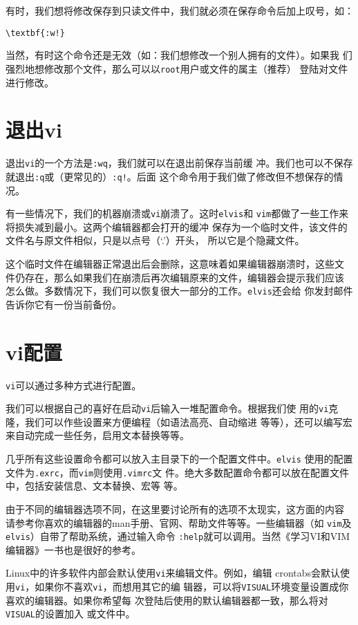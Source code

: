 有时，我们想将修改保存到只读文件中，我们就必须在保存命令后加上叹号，如：
\begin{Verbatim}[frame=single,commandchars=\\\{\}]
\textbf{:w!}
\end{Verbatim}

当然，有时这个命令还是无效（如：我们想修改一个别人拥有的文件）。如果我
们强烈地想修改那个文件，那么可以以\texttt{root}用户或文件的属主（推荐）
登陆对文件进行修改。

\section{退出vi}
\label{sec:vi:quit}
退出\texttt{vi}的一个方法是\texttt{:wq}，我们就可以在退出前保存当前缓
冲。我们也可以不保存就退出\texttt{:q}或（更常见的）\texttt{:q!}。后面
这个命令用于我们做了修改但不想保存的情况。

有一些情况下，我们的机器崩溃或\texttt{vi}崩溃了。这时\texttt{elvis}和
\texttt{vim}都做了一些工作来将损失减到最小。这两个编辑器都会打开的缓冲
保存为一个临时文件，该文件的文件名与原文件相似，只是以点号（`.'）开头，
所以它是个隐藏文件。

这个临时文件在编辑器正常退出后会删除，这意味着如果编辑器崩溃时，这些文
件仍存在，那么如果我们在崩溃后再次编辑原来的文件，编辑器会提示我们应该
怎么做。多数情况下，我们可以恢复很大一部分的工作。\texttt{elvis}还会给
你发封邮件告诉你它有一份当前备份。

\section{vi配置}
\label{sec:vi:configuration}
\texttt{vi}可以通过多种方式进行配置。

我们可以根据自己的喜好在启动\texttt{vi}后输入一堆配置命令。根据我们使
用的\texttt{vi}克隆，我们可以作些设置来方便编程（如语法高亮、自动缩进
等等），还可以编写宏来自动完成一些任务，启用文本替换等等。

几乎所有这些设置命令都可以放入主目录下的一个配置文件中。\texttt{elvis}
使用的配置文件为\texttt{.exrc}，而\texttt{vim}则使用\texttt{.vimrc}文
件。绝大多数配置命令都可以放在配置文件中，包括安装信息、文本替换、宏等
等。

由于不同的编辑器选项不同，在这里要讨论所有的选项不太现实，这方面的内容
请参考你喜欢的编辑器的man手册、官网、帮助文件等等。一些编辑器（如
\texttt{vim}及\texttt{elvis}）自带了帮助系统，通过输入命令
\texttt{:help}就可以调用。当然《学习VI和VIM编辑器》一书也是很好的参考。

Linux中的许多软件内部会默认使用\texttt{vi}来编辑文件。例如，编辑
crontabs会默认使用\texttt{vi}，如果你不喜欢\texttt{vi}，而想用其它的编
辑器，可以将\texttt{VISUAL}环境变量设置成你喜欢的编辑器。如果你希望每
次登陆后使用的默认编辑器都一致，那么将对\texttt{VISUAL}的设置加入
或文件中。

